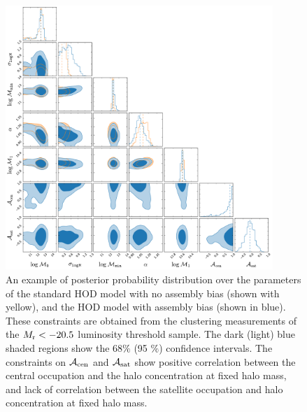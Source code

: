 \documentclass[twocolumn]{aastex61}
\newcommand{\acen}{\mathcal{A}_{\rm cen}}
\newcommand{\asat}{\mathcal{A}_{\rm sat}}
\begin{document}
\begin{figure}[p]~\\
\begin{center}
\includegraphics[width=0.9\textwidth]{post20_5combined.pdf}
\caption{An example of posterior probability distribution over the parameters of the standard HOD model with no assembly bias (shown with yellow), and the HOD model with assembly bias (shown in blue). These constraints are obtained from the clustering measurements of the $M_{\rm r} < -20.5$ luminosity threshold sample. The dark (light) blue shaded regions show the 68$\%$ (95 $\%$) confidence intervals. The constraints on $\acen$ and $\asat$ show positive correlation between the central occupation and the halo concentration at fixed halo mass, and lack of correlation between the satellite occupation and halo concentration at fixed halo mass.}
\label{fig:posterior}
\end{center}
\end{figure}



\end{document}
